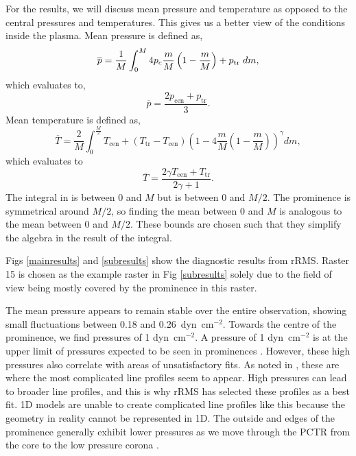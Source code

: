 For the results, we will discuss mean pressure and temperature as opposed to the central pressures and temperatures. This gives us a better view of the conditions inside the plasma.
Mean pressure is defined as,
\begin{equation}
    \overline{p}=\frac{1}{M}\int_0^M 4p_c\frac{m}{M}\left(1-\frac{m}{M}\right)+p_{\text{tr}}\hspace{0.1cm}dm,
    \label{meanpresint}
\end{equation}
which evaluates to,
\begin{equation}
    \overline{p}=\frac{2p_{\text{cen}}+p_{\text{tr}}}{3}.
    \label{meanpres}
\end{equation}
Mean temperature is defined as,
\begin{equation}
    \overline{T}=\frac{2}{M}\int_0^{\frac{M}{2}}T_{\text{cen}}+(T_{\text{tr}}-T_{\text{cen}})\left(1-4\frac{m}{M}\left(1-\frac{m}{M}\right)\right)^\gamma dm,
    \label{meantempint}
\end{equation}
which evaluates to
\begin{equation}
    \overline{T}=\frac{2\gamma T_{\text{cen}}+T_{\text{tr}}}{2\gamma+1}.
    \label{meantemp}
\end{equation}
The integral in  is between 0 and $M$ but  is between 0 and $M/2$. The prominence is symmetrical around $M/2$, so finding the mean between 0 and $M$ is analogous to the mean between 0 and $M/2$. These bounds are chosen such that they simplify the algebra in the result of the integral.

Figs \ref{mainresults} and \ref{subresults} show the diagnostic results from rRMS. Raster 15 is chosen as the example raster in Fig \ref{subresults} solely due to the field of view being mostly covered by the prominence in this raster.

The mean pressure appears to remain stable over the entire observation, showing small fluctuations between 0.18 and 0.26~dyn~cm$^{-2}$. Towards the centre of the prominence, we find pressures of 1 dyn~cm$^{-2}$. A pressure of 1 dyn~cm$^{-2}$ is at the upper limit of pressures expected to be seen in prominences \citep{labrosse_physics_2010}. However, these high pressures also correlate with areas of unsatisfactory fits. As noted in , these are where the most complicated line profiles seem to appear. High pressures can lead to broader line profiles, and this is why rRMS has selected these profiles as a best fit. 1D models are unable to create complicated line profiles like this because the geometry in reality cannot be represented in 1D. The outside and edges of the prominence generally exhibit lower pressures as we move through the PCTR from the core to the low pressure corona \citep{aschwanden_physics_2004}.

